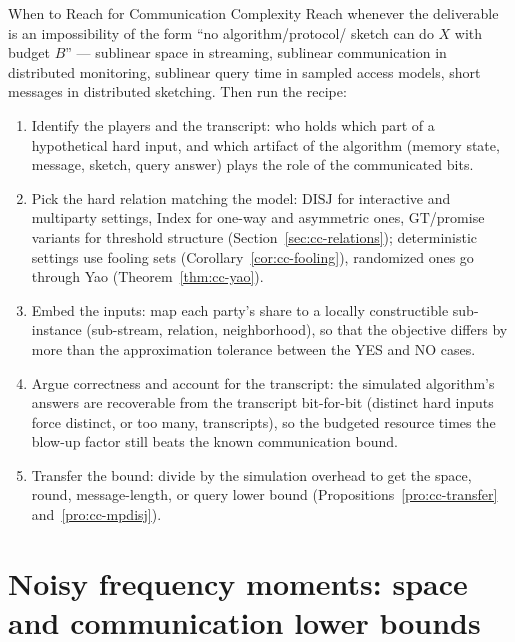 \begin{reachbox}{When to Reach for Communication Complexity}
Reach whenever the deliverable is an impossibility of the form ``no algorithm/protocol/
sketch can do $X$ with budget $B$'' --- sublinear space in streaming, sublinear
communication in distributed monitoring, sublinear query time in sampled access
models, short messages in distributed sketching. Then run the recipe:
\begin{enumerate}
\item Identify the players and the transcript: who holds which part of a hypothetical
  hard input, and which artifact of the algorithm (memory state, message, sketch,
  query answer) plays the role of the communicated bits.
\item Pick the hard relation matching the model: $\mathrm{DISJ}$ for interactive and
  multiparty settings, $\mathrm{Index}$ for one-way and asymmetric ones,
  $\mathrm{GT}$/promise variants for threshold structure
  (Section~\ref{sec:cc-relations}); deterministic settings use fooling sets
  (Corollary~\ref{cor:cc-fooling}), randomized ones go through Yao
  (Theorem~\ref{thm:cc-yao}).
\item Embed the inputs: map each party's share to a locally constructible sub-instance
  (sub-stream, relation, neighborhood), so that the objective differs by more than
  the approximation tolerance between the YES and NO cases.
\item Argue correctness and account for the transcript: the simulated algorithm's
  answers are recoverable from the transcript bit-for-bit (distinct hard inputs force
  distinct, or too many, transcripts), so the budgeted resource times the blow-up
  factor still beats the known communication bound.
\item Transfer the bound: divide by the simulation overhead to get the space, round,
  message-length, or query lower bound (Propositions~\ref{pro:cc-transfer}
  and~\ref{pro:cc-mpdisj}).
\end{enumerate}
\end{reachbox}

\section{Noisy frequency moments: space and communication lower bounds}
\label{sec:cc-fp}

